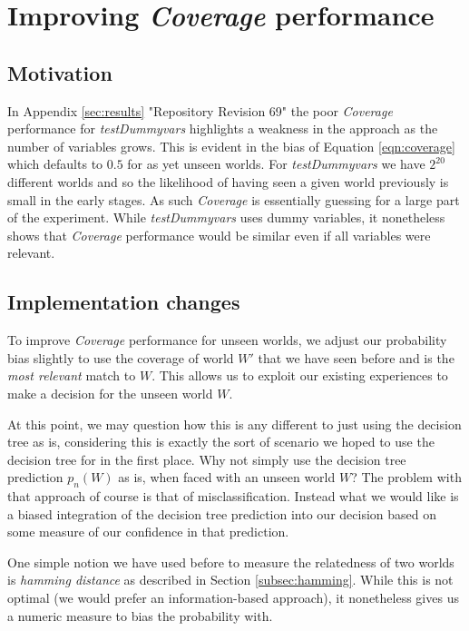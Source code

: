 \documentclass[a4paper]{article}
\newcommand{\cov}{\emph{Coverage}\xspace}
\newcommand{\dt}{{decision tree}\xspace}
\begin{document}
\section{Improving {\cov} performance}
\label{sec:coverage2}

\subsection{Motivation}
\label{subsec:coverage2-motivation}

In Appendix \ref{sec:results} "Repository Revision 69" the poor \cov performance for \textit{testDummyvars} highlights a weakness in the approach as the number of variables grows. This is evident in the bias of Equation \ref{eqn:coverage} which defaults to $0.5$ for as yet unseen worlds. For \textit{testDummyvars} we have $2^{20}$ different worlds and so the likelihood of having seen a given world previously is small in the early stages. As such \cov is essentially guessing for a large part of the experiment. While \textit{testDummyvars} uses dummy variables, it nonetheless shows that \cov performance would be similar even if all variables were relevant.


\subsection{Implementation changes}
\label{subsec:coverage2-implementation}

To improve \cov performance for unseen worlds, we adjust our probability bias slightly to use the coverage of world $W'$ that we have seen before and is the \textit{most relevant} match to $W$. This allows us to exploit our existing experiences to make a decision for the unseen world $W$. 

At this point, we may question how this is any different to just using the \dt as is, considering this is exactly the sort of scenario we hoped to use the decision tree for in the first place. Why not simply use the \dt prediction $p_n(W)$ as is, when faced with an unseen world $W$? The problem with that approach of course is that of misclassification. Instead what we would like is a biased integration of the \dt prediction into our decision based on some measure of our confidence in that prediction.

One simple notion we have used before to measure the relatedness of two worlds is \textit{hamming distance} as described in Section \ref{subsec:hamming}. While this is not optimal (we would prefer an information-based approach), it nonetheless gives us a numeric measure to bias the probability with.
\end{document}
